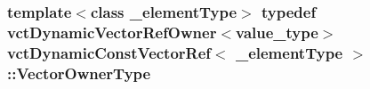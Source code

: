 \hypertarget{classvct_dynamic_const_vector_ref_a3399abece6e1a8d528f82fa8148a751d}{
\subsubsection[{Vector\-Owner\-Type}]{\setlength{\rightskip}{0pt plus 5cm}template$<$class \-\_\-element\-Type$>$ typedef {\bf vct\-Dynamic\-Vector\-Ref\-Owner}$<$value\-\_\-type$>$ {\bf vct\-Dynamic\-Const\-Vector\-Ref}$<$ \-\_\-element\-Type $>$\-::{\bf Vector\-Owner\-Type}}}\label{classvct_dynamic_const_vector_ref_a3399abece6e1a8d528f82fa8148a751d}


